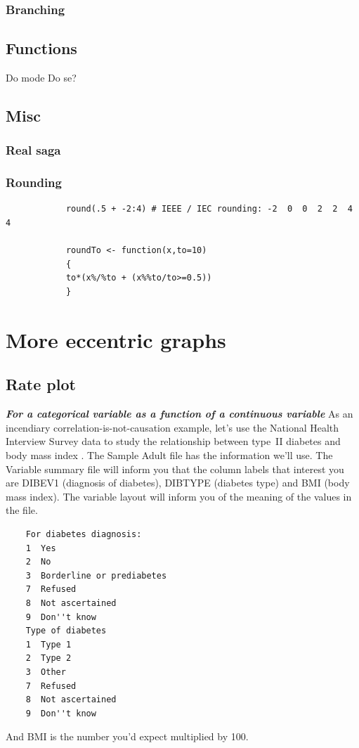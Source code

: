 \documentclass{report}
\newcommand{\notefor}[1]{\hfill\textbf{\textit{#1}}}
\begin{document}
		\subsection{Branching}\label{subsec:branching}
	\section{Functions}\label{sec:functions}
	Do mode
	Do se?
	
	\section{Misc}
		\subsection{Real saga}
		\subsection{Rounding}
		
		\begin{verbatim}
			round(.5 + -2:4) # IEEE / IEC rounding: -2  0  0  2  2  4  4
			
			roundTo <- function(x,to=10)
			{
			to*(x%/%to + (x%%to/to>=0.5))
			}
		\end{verbatim}
		
		
	
\chapter{More eccentric graphs}
	\section{Rate plot}\label{sec:cdplot}
	\notefor{For a categorical variable as a function of a continuous variable}
	As an incendiary correlation-is-not-causation example, let's use the National Health Interview Survey data to study the relationship between type~II diabetes and body mass index \cite{nhis}. The Sample Adult file has the information we'll use. The Variable summary file will inform you that the column labels that interest you are DIBEV1 (diagnosis of diabetes), DIBTYPE (diabetes type) and BMI (body mass index). The variable layout will inform you of the meaning of the values in the file.
	\begin{verbatim}
	For diabetes diagnosis: 
	1  Yes
	2  No
	3  Borderline or prediabetes
	7  Refused
	8  Not ascertained
	9  Don''t know 
	Type of diabetes
	1  Type 1
	2  Type 2
	3  Other
	7  Refused
	8  Not ascertained
	9  Don''t know 
	\end{verbatim}
	And BMI is the number you'd expect multiplied by 100.
	
\end{document}
